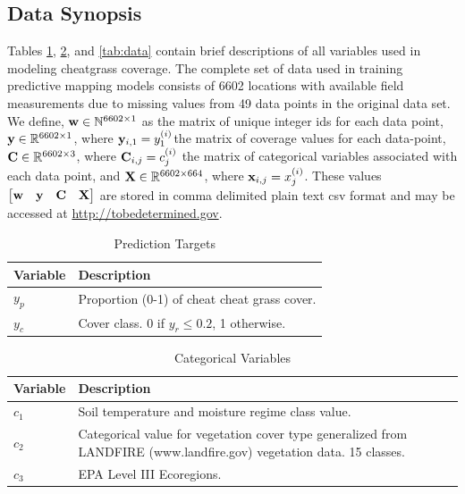 \def\year{2017}\relax \documentclass[letterpaper]{article}
\begin{document}
\subsection{Data Synopsis}
 Tables \ref{tab:targets}, \ref{tab:cat}, and \ref{tab:data} contain brief descriptions of all variables used in modeling cheatgrass coverage. 
The complete set of data used in training predictive mapping models consists of 6602 locations with available field measurements due to missing values from 49 data points in the original data set. 
We define, ${\bf w} \in \mathbb{N}^{6602 \times 1}$ as the matrix of unique integer ids for each data point, 
${\bf y} \in \mathbb{R}^{6602 \times 1}$, where  ${\bf y }_{i,1} = y^{(i)}_1$the matrix of coverage values for each data-point, 
${\bf C} \in \mathbb{R}^{6602\times 3}$, where  ${\bf C }_{i,j} = c^{(i)}_j$ the matrix of categorical variables associated 
with each data point, and ${\bf X} \in \mathbb{R}^{6602\times 664}$, 
where  ${\bf x }_{i,j} = x^{(i)}_j$. 
These values $\begin{bmatrix} {\bf w} & {\bf y} & {\bf C} & {\bf X}\end{bmatrix}$ are stored in comma delimited plain text csv format and may be accessed at \url{http://tobedetermined.gov}.
\begin{table}
\begin{tabularx}{\linewidth}{@{ }l X@{ }}
\toprule[.2em]
{\bf Variable} &{\bf Description} \\
\midrule
$y_p$ & Proportion (0-1) of cheat cheat grass cover. \\
 $y_c$ &Cover class. 0 if $y_r \leq 0.2$, 1 otherwise.\\
\bottomrule[.2em]
\end{tabularx}
\caption{Prediction Targets} \label{tab:targets}
\end{table}

\begin{table}
\begin{tabularx}{\linewidth}{@{ }l X@{ }}
\toprule[.2em]
{\bf Variable} &{\bf Description} \\
\midrule
$c_1$ & Soil temperature and moisture regime class value. \\
$c_2$ & Categorical value for vegetation cover type generalized from LANDFIRE (www.landfire.gov) vegetation data. 15 classes.\\
$c_3$ & EPA Level III Ecoregions.\\	
\bottomrule[.2em]
\end{tabularx}
\caption{Categorical Variables} \label{tab:cat}
\end{table}
\end{document}
